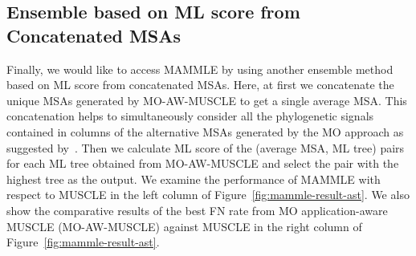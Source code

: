 
\subsection{Ensemble based on ML score from Concatenated MSAs}
Finally, we would like to access MAMMLE by using another ensemble method based on ML score from concatenated MSAs. Here, at first we concatenate the unique MSAs generated by MO-AW-MUSCLE to get a single average MSA. This concatenation helps to simultaneously consider all the phylogenetic signals contained in columns of the alternative MSAs generated by the MO approach as suggested by~\cite{ashkenazy2018multiple}.
Then we calculate ML score of the (average MSA, ML tree) pairs for each ML tree obtained from MO-AW-MUSCLE and select the pair with the highest tree as the output. We examine the performance of MAMMLE with respect to MUSCLE in the left column of Figure~\ref{fig:mammle-result-ast}. We also show the comparative results of the best FN rate from MO application-aware MUSCLE (MO-AW-MUSCLE) against MUSCLE in the right column of Figure~\ref{fig:mammle-result-ast}.

